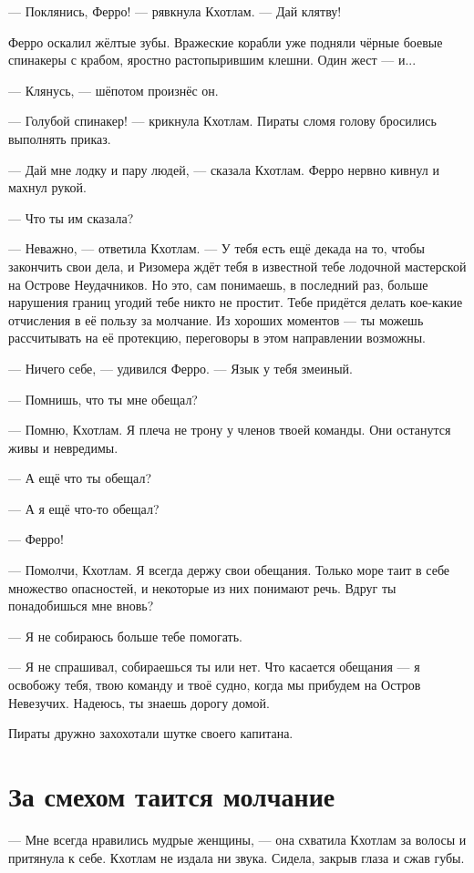 --- Поклянись, Ферро! --- рявкнула Кхотлам.
--- Дай клятву!

Ферро оскалил жёлтые зубы.
Вражеские корабли уже подняли чёрные боевые спинакеры с крабом, яростно растопырившим клешни.
Один жест --- и...

--- Клянусь, --- шёпотом произнёс он.

--- Голубой спинакер! --- крикнула Кхотлам.
Пираты сломя голову бросились выполнять приказ.

--- Дай мне лодку и пару людей, --- сказала Кхотлам.
Ферро нервно кивнул и махнул рукой.

\asterism

--- Что ты им сказала?

--- Неважно, --- ответила Кхотлам.
--- У тебя есть ещё декада на то, чтобы закончить свои дела, и Ризомера ждёт тебя в известной тебе лодочной мастерской на Острове Неудачников.
Но это, сам понимаешь, в последний раз, больше нарушения границ угодий тебе никто не простит.
Тебе придётся делать кое-какие отчисления в её пользу за молчание.
Из хороших моментов --- ты можешь рассчитывать на её протекцию, переговоры в этом направлении возможны.

--- Ничего себе, --- удивился Ферро.
--- Язык у тебя змеиный.

--- Помнишь, что ты мне обещал?

--- Помню, Кхотлам.
Я плеча не трону у членов твоей команды.
Они останутся живы и невредимы.

--- А ещё что ты обещал?

--- А я ещё что-то обещал?

--- Ферро!

--- Помолчи, Кхотлам.
Я всегда держу свои обещания.
Только море таит в себе множество опасностей, и некоторые из них понимают речь.
Вдруг ты понадобишься мне вновь?

--- Я не собираюсь больше тебе помогать.

--- Я не спрашивал, собираешься ты или нет.
Что касается обещания --- я освобожу тебя, твою команду и твоё судно, когда мы прибудем на Остров Невезучих.
Надеюсь, ты знаешь дорогу домой.

Пираты дружно захохотали шутке своего капитана.

\section{За смехом таится молчание}

--- Мне всегда нравились мудрые женщины, --- она схватила Кхотлам за волосы и притянула к себе.
Кхотлам не издала ни звука.
Сидела, закрыв глаза и сжав губы.

